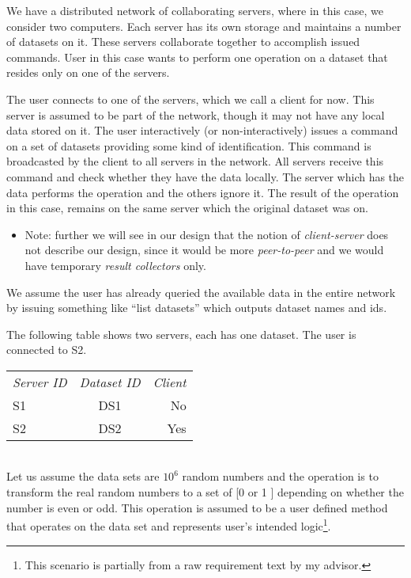 We have a distributed network of collaborating servers, where in this case, we consider two computers. 
Each server has its own storage and maintains a number of datasets on it. These servers collaborate 
together to accomplish issued commands. 
User in this case wants to perform one operation on a dataset that resides only on one of the servers. 

The user connects to one of the servers, which we call a client for now. 
This server is assumed to be part of the network, though it may not have any local data stored on it.
The user interactively (or non-interactively) issues a command on a set of datasets providing some kind of identification.
This command is broadcasted by the client to all servers in the network.
All servers receive this command and check whether they have the data locally. 
The server which has the data performs the operation and the others ignore it.
The result of the operation in this case, remains on the same server which the original dataset was on. 

\begin{itemize}
\item Note: further we will see in our design that the notion of \textit{client-server} does not describe
our design, since it would be more \textit{peer-to-peer} and we would have temporary \textit{result collectors} only.
\end{itemize}

We assume the user has already queried the available data in the entire network by 
issuing something like “list datasets” which outputs dataset names and ids.

The following table shows two servers, each has one dataset. The user is connected to S2.\\

\begin{tabular}{ l c r }
\em{Server ID} & \em{ Dataset ID} & \em{ Client} \\
S1 & DS1 & No \\
S2 & DS2 & Yes \\
\end{tabular}\\

Let us assume the data sets are \(10^6\) random numbers and
the operation is to transform the real random numbers to a set of [0 or 1 ] depending on whether the number is even or odd. 
This operation is assumed to be a user defined method that operates on the data set and represents user's intended 
logic\footnote{This scenario is partially from a raw requirement text by my advisor.}.

